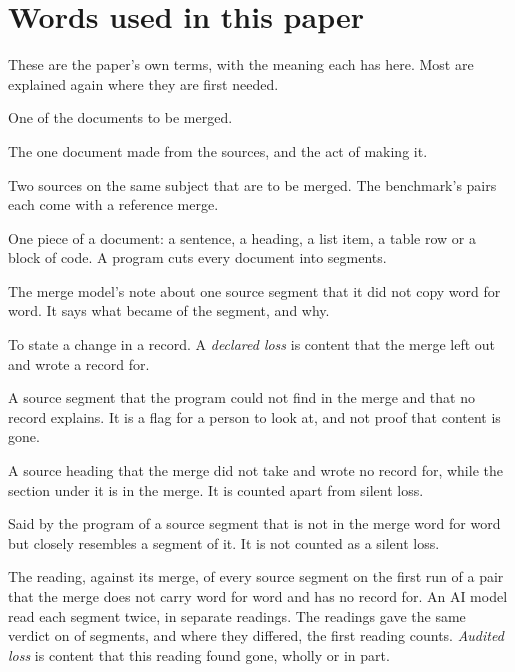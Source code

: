 \section{Words used in this paper}
\label{sec:words}

These are the paper's own terms, with the meaning each has here. Most are explained again where they are first needed.
\begin{wordlist}
\item[source] One of the documents to be merged.
\item[merge] The one document made from the sources, and the act of making it.
\item[pair] Two sources on the same subject that are to be merged. The benchmark's pairs each come with a reference merge.
\item[segment] One piece of a document: a sentence, a heading, a list item, a table row or a block of code. A program cuts every document into segments.
\item[record] The merge model's note about one source segment that it did not copy word for word. It says what became of the segment, and why.
\item[declare] To state a change in a record. A \emph{declared loss} is content that the merge left out and wrote a record for.
\item[silent loss] A source segment that the program could not find in the merge and that no record explains. It is a flag for a person to look at, and not proof that content is gone.
\item[untaken heading] A source heading that the merge did not take and wrote no record for, while the section under it is in the merge. It is counted apart from silent loss.
\item[reworded] Said by the program of a source segment that is not in the merge word for word but closely resembles a segment of it. It is not counted as a silent loss.
\item[audit] The reading, against its merge, of every source segment on the first run of a pair that the merge does not carry word for word and has no record for. An AI model read each segment twice, in separate readings. The readings gave the same verdict on  of  segments, and where they differed, the first reading counts. \emph{Audited loss} is content that this reading found gone, wholly or in part.

\end{wordlist}

